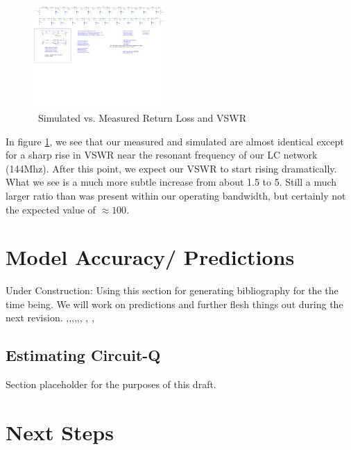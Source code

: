 \documentclass[journal]{IEEEtran}
\begin{document}
\begin{figure}[htb]
\centering
\includegraphics[width=0.45\textwidth,page = 3]{Fixed_ZeroBias_Sparam_Sims.pdf}
\caption{\ Simulated vs. Measured Return Loss and VSWR
}\label{fig:VSWRandReturnLoss}
\end{figure}

In figure \ref{fig:VSWRandReturnLoss}, we see that our measured and simulated are almost identical except for a sharp rise in VSWR near the resonant frequency of our LC network (144Mhz). After this point, we expect our VSWR to start rising dramatically. What we see is a much more subtle increase from about 1.5 to 5. Still a much larger ratio than was present within our operating bandwidth, but certainly not the expected value of $\approx 100$.






\section{ Model Accuracy/ Predictions }
Under Construction: Using this section for generating bibliography for the the time being. We will work on predictions and further flesh things out during the next revision.
\cite{ould2011circuit} \cite{distributedAnalogPhase},\cite{ellinger2003varactor},\cite{lee2012nonlinear},\cite{UltraCompact},\cite{EffVaractorCharac},\cite{FastHighVoltageNLTL}, \cite{nikoo2018theory}, \cite{TwoLine},\cite{ComputerExpNLTL}


\subsection{Estimating Circuit-Q}
Section placeholder for the purposes of this draft.


\section{Next Steps}\label{sec:NextSteps}
\end{document}
